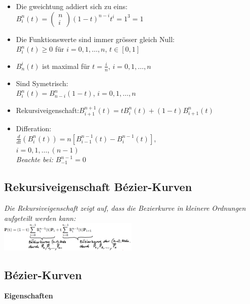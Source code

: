 \begin{itemize}
    \item Die gweichtung addiert sich zu eins: \\
        $B_i^n(t) = \left(\begin{matrix}
            n \\ i
        \end{matrix}\right) (1 - t)^{n-i}t^i = 1^3 = 1$
    \item Die Funktionswerte sind immer grösser gleich Null:\\
        $B_i^n(t) \geq 0$ für $i = 0,1,\dots, n$, $t \in [0,1]$
    \item  $B^i_n(t)$ ist maximal für $t=\frac{i}{n}$, $i = 0,1,\dots, n$
    \item Sind Symetrisch: \\
          $B^n_i(t) = B^n_{n-i}(1-t)$, $i = 0,1,\dots, n$
    \item Rekursiveigenschaft:$B^{n+1}_{i+1}(t) = tB_i^n(t) + (1-t)B^n_{i+1}(t)$
    \item Differation: \\
        $\frac{d}{dt}(B^n_i(t)) = n[B^{n-1}_{i-1}(t) - B^{n-1}_i(t)]$,\\
        $i = 0,1,\dots, (n-1)$\\
        \textit{Beachte bei: $B_{-1}^{n-1}=0$}
\end{itemize}

\subsection{Rekursiveigenschaft Bézier-Kurven}

\textit{Die Rekursiveigenschaft zeigt auf, dass die Bezierkurve in
kleinere Ordnungen aufgeteilt werden kann:}\\

\includegraphics[width=0.5\textwidth]{assets/curves-recursive-spline.png}

\subsection{Bézier-Kurven}

\textbf{Eigenschaften}

